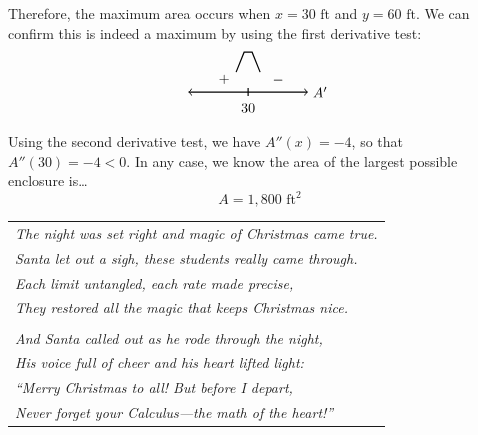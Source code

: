 \documentclass[12pt,letterpaper]{exam}
\begin{document}
\begin{questions}
{\[	\]
Therefore, the maximum area occurs when $x= 30 \text{ ft}$ and $y= 60 \text{ ft}$. We can confirm this is indeed a maximum by using the first derivative test:
	\[
	\begin{tikzpicture}
	\draw[line width=0.03cm,<->] (-1.5,0) -- (1.5,0); 
	\draw[line width=0.03cm] (0,-0.1) -- (0,0.1);
	\node at (0,-0.4) {$30$};
	\node at (1.8,0) {$A'$};
	\node at (-0.6,0.32) {$+$};
	\node at (0.75,0.3) {$-$};
	\draw[line width=0.03cm] (-0.3,0.5) -- (-0.1,1) -- (0.1,1) -- (0.3,0.5);
	\end{tikzpicture}
	\]
Using the second derivative test, we have $A''(x)= -4$, so that $A''(30)= -4 < 0$. In any case, we know the area of the largest possible enclosure is\dots
	\[
	\boxed{A= 1,\!800 \text{ ft}^2}
	\]
}
\end{questions}


\newpage

\phantom{.} \vfill
	\begin{table}[h]
	\centering
	\begin{tabular}{l}
	{\itshape The night was set right and magic of Christmas came true.} \\
	{\itshape Santa let out a sigh, these students really came through.} \\
	{\itshape Each limit untangled, each rate made precise,} \\
	{\itshape They restored all the magic that keeps Christmas nice.} \\
	\\
	{\itshape And Santa called out as he rode through the night,} \\
	{\itshape His voice full of cheer and his heart lifted light:} \\
	{\itshape ``Merry Christmas to all! But before I depart,} \\
	{\itshape Never forget your Calculus---the math of the heart!''} 
	\end{tabular}
	\end{table}
\phantom{.} \vfill
\end{document}
